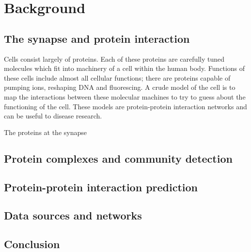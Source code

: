 \chapter{Background}
\label{background}

\lipsum[1]


\section{The synapse and protein interaction}

Cells consist largely of proteins.
Each of these proteins are carefully tuned molecules which fit into machinery of a cell within the human body.
Functions of these cells include almost all cellular functions; there are proteins capable of pumping ions, reshaping DNA and fluorescing\cite{alberts_molecular_2008}.
A crude model of the cell is to map the interactions between these molecular machines to try to guess about the functioning of the cell.
These models are protein-protein interaction networks and can be useful to disease research.

The proteins at the synapse 


\section{Protein complexes and community detection}

\lipsum[4-8]


\section{Protein-protein interaction prediction}

\lipsum[3-10]



\section{Data sources and networks}

\lipsum[11-15]

\section*{Conclusion}

\lipsum[16]
